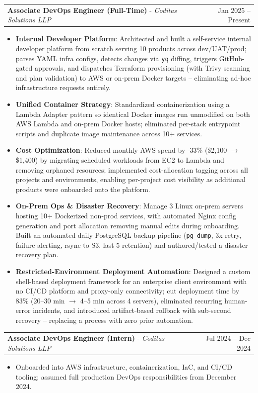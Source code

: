 \documentclass[letterpaper,11pt]{article}
\makeatletter
\newcommand{\resumeWorkHeading}[3]{
  \vspace{-2pt}\item
    \begin{tabular*}{0.97\textwidth}{l@{\extracolsep{\fill}}r}
      \textbf{#1} - \textit{#2} & #3 \\
    \end{tabular*}\vspace{-7pt}
}
\newcommand{\resumeItemListStart}{\begin{itemize}[leftmargin=*,itemsep=0pt]}
\newcommand{\resumeItemListEnd}{\end{itemize}\vspace{-4pt}}
\makeatother
\begin{document}
  \resumeWorkHeading
    {Associate DevOps Engineer (Full-Time)}{Coditas Solutions LLP}{Jan 2025 -- Present}
    \resumeItemListStart
      \item \textbf{Internal Developer Platform}: Architected and built a self-service internal developer platform from scratch serving 10 products across dev/UAT/prod; parses YAML infra configs, detects changes via \texttt{yq} diffing, triggers GitHub-gated approvals, and dispatches Terraform provisioning (with Trivy scanning and plan validation) to AWS or on-prem Docker targets -- eliminating ad-hoc infrastructure requests entirely.
      \item \textbf{Unified Container Strategy}: Standardized containerization using a Lambda Adapter pattern so identical Docker images run unmodified on both AWS Lambda and on-prem Docker hosts; eliminated per-stack entrypoint scripts and duplicate image maintenance across 10+ services.
      \item \textbf{Cost Optimization}: Reduced monthly AWS spend by -33\% (\$2,100 $\rightarrow$ \$1,400) by migrating scheduled workloads from EC2 to Lambda and removing orphaned resources; implemented cost-allocation tagging across all projects and environments, enabling per-project cost visibility as additional products were onboarded onto the platform.
      \item \textbf{On-Prem Ops \& Disaster Recovery}: Manage 3 Linux on-prem servers hosting 10+ Dockerized non-prod services, with automated Nginx config generation and port allocation removing manual edits during onboarding. Built an automated daily PostgreSQL backup pipeline (\texttt{pg\_dump}, 3x retry, failure alerting, rsync to S3, last-5 retention) and authored/tested a disaster recovery plan.
      \item \textbf{Restricted-Environment Deployment Automation}: Designed a custom shell-based deployment framework for an enterprise client environment with no CI/CD platform and proxy-only connectivity; cut deployment time by 83\% (20--30 min $\rightarrow$ 4--5 min across 4 servers), eliminated recurring human-error incidents, and introduced artifact-based rollback with sub-second recovery -- replacing a process with zero prior automation.
    \resumeItemListEnd

\resumeWorkHeading
    {Associate DevOps Engineer (Intern)}{Coditas Solutions LLP}{Jul 2024 -- Dec 2024}
    \resumeItemListStart
      \item Onboarded into AWS infrastructure, containerization, IaC, and CI/CD tooling; assumed full production DevOps responsibilities from December 2024.
    \resumeItemListEnd
\end{document}
